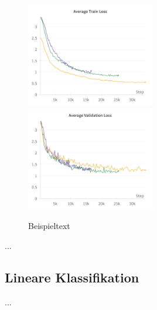 \begin{figure}
	\centering
	\includegraphics[width=0.5\textwidth]{figure_results_supcon-pre_avg-train-loss.png}%
	\includegraphics[width=0.5\textwidth]{figure_results_supcon-pre_avg-val-loss.png}
	\caption{Beispieltext}
\end{figure}

...

\subsection{Lineare Klassifikation}

...

